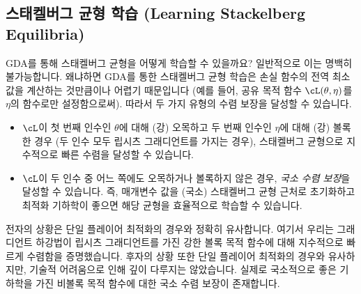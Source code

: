 \documentclass[../../book-main_ko.tex]{subfiles}
\begin{document}
\subsection{스태켈버그 균형 학습 (Learning Stackelberg Equilibria)}

GDA를 통해 스태켈버그 균형을 어떻게 학습할 수 있을까요? 일반적으로 이는 명백히 불가능합니다. 왜냐하면 GDA를 통한 스태켈버그 균형 학습은 손실 함수의 전역 최소값을 계산하는 것만큼이나 어렵기 때문입니다 (예를 들어, 공유 목적 함수 \(\cL(\theta, \eta)\)를 \(\eta\)의 함수로만 설정함으로써). 따라서 두 가지 유형의 수렴 보장을 달성할 수 있습니다.
\begin{itemize}
    \item \(\cL\)이 첫 번째 인수인 \(\theta\)에 대해 (강) 오목하고 두 번째 인수인 \(\eta\)에 대해 (강) 볼록한 경우 (두 인수 모두 립시츠 그래디언트를 가지는 경우), 스태켈버그 균형으로 지수적으로 빠른 수렴을 달성할 수 있습니다.
    \item \(\cL\)이 두 인수 중 어느 쪽에도 오목하거나 볼록하지 않은 경우, \textit{국소 수렴 보장}을 달성할 수 있습니다. 즉, 매개변수 값을 (국소) 스태켈버그 균형 근처로 초기화하고 최적화 기하학이 좋으면 해당 균형을 효율적으로 학습할 수 있습니다.
\end{itemize}

전자의 상황은 단일 플레이어 최적화의 경우와 정확히 유사합니다. 여기서 우리는 그래디언트 하강법이 립시츠 그래디언트를 가진 강한 볼록 목적 함수에 대해 지수적으로 빠르게 수렴함을 증명했습니다. 후자의 상황 또한 단일 플레이어 최적화의 경우와 유사하지만, 기술적 어려움으로 인해 깊이 다루지는 않았습니다. 실제로 국소적으로 좋은 기하학을 가진 비볼록 목적 함수에 대한 국소 수렴 보장이 존재합니다.
\end{document}
